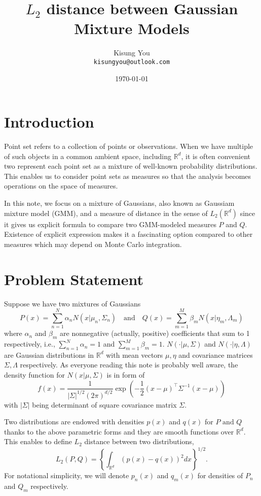 \documentclass[fontsize=12pt]{article}
\title{$L_2$ distance between Gaussian Mixture Models}
\author{
	Kisung You\\
	\texttt{kisungyou@outlook.com}
}
\date{\today}
\begin{document}
\maketitle

\section{Introduction}

Point set refers to a collection of points or observations. When we have multiple of such objects in a common ambient space, including $\mathbb{R}^d$, it is often convenient two represent each point set as a mixture of well-known probability distributions. This enables us to consider point sets as measures so that the analysis becomes operations on the space of measures. 

In this note, we focus on a mixture of Gaussians, also known as Gaussiam mixture model (GMM), and a measure of distance in the sense of $L_2 (\mathbb{R}^d)$ since it gives us explicit formula to compare two GMM-modeled measures $P$ and $Q$. Existence of explicit expression makes it a fascinating option compared to other measures which may depend on Monte Carlo integration. 


\section{Problem Statement}
Suppose we have two mixtures of Gaussians
\begin{equation*}
P(x)= \sum_{n=1}^N \alpha_n N(x|\mu_n, \Sigma_n) \quad \text{and} \quad
Q(x) = \sum_{m=1}^M \beta_m N(x|\eta_m, \Lambda_m)
\end{equation*}
where $\alpha_n$ and $\beta_m$ are nonnegative (actually, positive) coefficients that sum to 1 respectively, i.e., $\sum_{n=1}^N \alpha_n = 1$ and $\sum_{m=1}^M \beta_m = 1$. $N(\cdot | \mu, \Sigma)$ and $N(\cdot|\eta, \Lambda)$ are Gaussian distributions in $\mathbb{R}^d$ with mean vectors $\mu, \eta$ and covariance matrices $\Sigma, \Lambda$ respectively. As everyone reading this note is probably well aware, the density function for $N(x|\mu,\Sigma)$ is in form of 
\begin{equation*}
f (x) = \frac{1}{| \Sigma |^{1/2} (2\pi)^{d/2}} 
\exp \left(
-\frac{1}{2} (x-\mu)^\top \Sigma^{-1} (x-\mu)
\right)
\end{equation*}
with $|\Sigma|$ being determinant of square covariance matrix $\Sigma$.


Two distributions are endowed with densities $p(x)$ and $q(x)$ for $P\text{ and }Q$ thanks to the above parametric forms and they are smooth functions over $\mathbb{R}^d$. This enables to define $L_2$ distance between two distributions,
\begin{equation}
L_2 (P,Q) = 
\left\lbrace
\int_{\mathbb{R}^d} (p(x)-q(x))^2 dx
\right\rbrace^{1/2}. 
\end{equation}
For notational simplicity, we will denote $p_n (x)$ and $q_m (x)$ for densities of $P_n$ and $Q_m$ respectively. 
\end{document}
